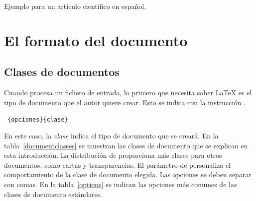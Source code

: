 Ejemplo para un art\'iculo cient\'ifico en español.




\section{El formato del documento}

\subsection{Clases de documentos}\label{sec:documentclass}

Cuando procesa un fichero de entrada, lo primero que necesita
saber \LaTeX{} es el tipo de documento que el autor quiere crear.
Esto se indica con la instrucci\'on .
\begin{command}
\ \lstinline+{opciones}{clase}+
\end{command}
\noindent En este caso, la \emph{clase} indica el tipo de
documento que se crear\'a. En la tabla~\ref{documentclasses} se
muestran las clases de documento que se explican en esta
introducci\'on. La distribuci\'on de \LaTeXe{} proporciona m\'as
clases para otros documentos, como cartas y transparencias. El
par\'ametro de \emph{} personaliza el comportamiento
de la clase de documento elegida. Las opciones se deben separar
con comas. En la tabla~\ref{options} se indican las opciones m\'as
comunes de las clases de documento est\'andares.


